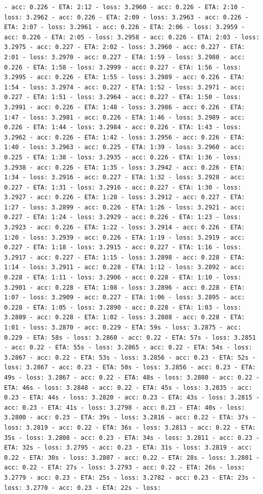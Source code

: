 \documentclass[11pt]{article}
\begin{document}
\begin{Verbatim}[commandchars=\\\{\}]
- acc: 0.226 - ETA: 2:12 - loss: 3.2960 - acc: 0.226 - ETA: 2:10 - loss: 3.2962 - acc: 0.226 - ETA: 2:09 - loss: 3.2963 - acc: 0.226 - ETA: 2:07 - loss: 3.2961 - acc: 0.226 - ETA: 2:06 - loss: 3.2959 - acc: 0.226 - ETA: 2:05 - loss: 3.2958 - acc: 0.226 - ETA: 2:03 - loss: 3.2975 - acc: 0.227 - ETA: 2:02 - loss: 3.2960 - acc: 0.227 - ETA: 2:01 - loss: 3.2970 - acc: 0.227 - ETA: 1:59 - loss: 3.2980 - acc: 0.226 - ETA: 1:58 - loss: 3.2999 - acc: 0.227 - ETA: 1:56 - loss: 3.2995 - acc: 0.226 - ETA: 1:55 - loss: 3.2989 - acc: 0.226 - ETA: 1:54 - loss: 3.2974 - acc: 0.227 - ETA: 1:52 - loss: 3.2971 - acc: 0.227 - ETA: 1:51 - loss: 3.2964 - acc: 0.227 - ETA: 1:50 - loss: 3.2991 - acc: 0.226 - ETA: 1:48 - loss: 3.2986 - acc: 0.226 - ETA: 1:47 - loss: 3.2981 - acc: 0.226 - ETA: 1:46 - loss: 3.2989 - acc: 0.226 - ETA: 1:44 - loss: 3.2984 - acc: 0.226 - ETA: 1:43 - loss: 3.2962 - acc: 0.226 - ETA: 1:42 - loss: 3.2956 - acc: 0.226 - ETA: 1:40 - loss: 3.2963 - acc: 0.225 - ETA: 1:39 - loss: 3.2960 - acc: 0.225 - ETA: 1:38 - loss: 3.2935 - acc: 0.226 - ETA: 1:36 - loss: 3.2938 - acc: 0.226 - ETA: 1:35 - loss: 3.2942 - acc: 0.226 - ETA: 1:34 - loss: 3.2916 - acc: 0.227 - ETA: 1:32 - loss: 3.2928 - acc: 0.227 - ETA: 1:31 - loss: 3.2916 - acc: 0.227 - ETA: 1:30 - loss: 3.2927 - acc: 0.226 - ETA: 1:28 - loss: 3.2912 - acc: 0.227 - ETA: 1:27 - loss: 3.2899 - acc: 0.226 - ETA: 1:26 - loss: 3.2921 - acc: 0.227 - ETA: 1:24 - loss: 3.2929 - acc: 0.226 - ETA: 1:23 - loss: 3.2923 - acc: 0.226 - ETA: 1:22 - loss: 3.2914 - acc: 0.226 - ETA: 1:20 - loss: 3.2939 - acc: 0.226 - ETA: 1:19 - loss: 3.2919 - acc: 0.227 - ETA: 1:18 - loss: 3.2915 - acc: 0.227 - ETA: 1:16 - loss: 3.2917 - acc: 0.227 - ETA: 1:15 - loss: 3.2898 - acc: 0.228 - ETA: 1:14 - loss: 3.2911 - acc: 0.228 - ETA: 1:12 - loss: 3.2892 - acc: 0.228 - ETA: 1:11 - loss: 3.2906 - acc: 0.228 - ETA: 1:10 - loss: 3.2901 - acc: 0.228 - ETA: 1:08 - loss: 3.2896 - acc: 0.228 - ETA: 1:07 - loss: 3.2909 - acc: 0.227 - ETA: 1:06 - loss: 3.2895 - acc: 0.228 - ETA: 1:05 - loss: 3.2890 - acc: 0.228 - ETA: 1:03 - loss: 3.2889 - acc: 0.228 - ETA: 1:02 - loss: 3.2888 - acc: 0.228 - ETA: 1:01 - loss: 3.2870 - acc: 0.229 - ETA: 59s - loss: 3.2875 - acc: 0.229 - ETA: 58s - loss: 3.2860 - acc: 0.22 - ETA: 57s - loss: 3.2851 - acc: 0.22 - ETA: 55s - loss: 3.2865 - acc: 0.22 - ETA: 54s - loss: 3.2867 - acc: 0.22 - ETA: 53s - loss: 3.2856 - acc: 0.23 - ETA: 52s - loss: 3.2867 - acc: 0.23 - ETA: 50s - loss: 3.2856 - acc: 0.23 - ETA: 49s - loss: 3.2867 - acc: 0.22 - ETA: 48s - loss: 3.2880 - acc: 0.22 - ETA: 46s - loss: 3.2848 - acc: 0.22 - ETA: 45s - loss: 3.2835 - acc: 0.23 - ETA: 44s - loss: 3.2820 - acc: 0.23 - ETA: 43s - loss: 3.2815 - acc: 0.23 - ETA: 41s - loss: 3.2798 - acc: 0.23 - ETA: 40s - loss: 3.2800 - acc: 0.23 - ETA: 39s - loss: 3.2816 - acc: 0.22 - ETA: 37s - loss: 3.2819 - acc: 0.22 - ETA: 36s - loss: 3.2813 - acc: 0.22 - ETA: 35s - loss: 3.2808 - acc: 0.23 - ETA: 34s - loss: 3.2811 - acc: 0.23 - ETA: 32s - loss: 3.2795 - acc: 0.23 - ETA: 31s - loss: 3.2819 - acc: 0.22 - ETA: 30s - loss: 3.2807 - acc: 0.22 - ETA: 28s - loss: 3.2801 - acc: 0.22 - ETA: 27s - loss: 3.2793 - acc: 0.22 - ETA: 26s - loss: 3.2779 - acc: 0.23 - ETA: 25s - loss: 3.2782 - acc: 0.23 - ETA: 23s - loss: 3.2770 - acc: 0.23 - ETA: 22s - loss: 
\end{Verbatim}
\end{document}
